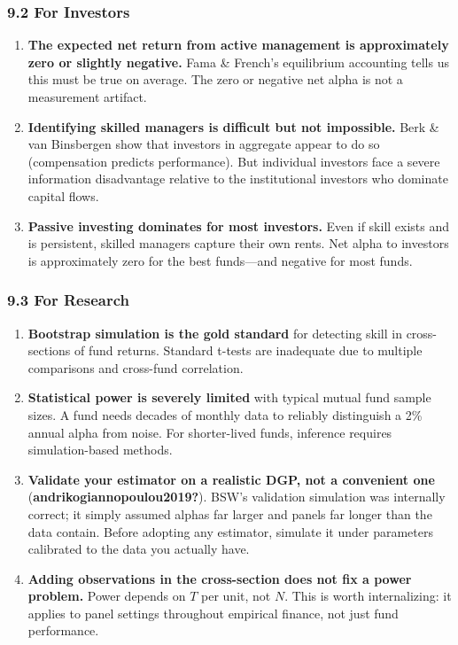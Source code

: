 \documentclass[
  letterpaper,
  DIV=11,
  numbers=noendperiod]{scrartcl}
\begin{document}
\subsubsection{9.2 For Investors}\label{for-investors}

\begin{enumerate}
\def\labelenumi{\arabic{enumi}.}
\setcounter{enumi}{3}
\item
  \textbf{The expected net return from active management is
  approximately zero or slightly negative.} Fama \& French's equilibrium
  accounting tells us this must be true on average. The zero or negative
  net alpha is not a measurement artifact.
\item
  \textbf{Identifying skilled managers is difficult but not impossible.}
  Berk \& van Binsbergen show that investors in aggregate appear to do
  so (compensation predicts performance). But individual investors face
  a severe information disadvantage relative to the institutional
  investors who dominate capital flows.
\item
  \textbf{Passive investing dominates for most investors.} Even if skill
  exists and is persistent, skilled managers capture their own rents.
  Net alpha to investors is approximately zero for the best funds---and
  negative for most funds.
\end{enumerate}

\subsubsection{9.3 For Research}\label{for-research}

\begin{enumerate}
\def\labelenumi{\arabic{enumi}.}
\setcounter{enumi}{6}
\item
  \textbf{Bootstrap simulation is the gold standard} for detecting skill
  in cross-sections of fund returns. Standard t-tests are inadequate due
  to multiple comparisons and cross-fund correlation.
\item
  \textbf{Statistical power is severely limited} with typical mutual
  fund sample sizes. A fund needs decades of monthly data to reliably
  distinguish a 2\% annual alpha from noise. For shorter-lived funds,
  inference requires simulation-based methods.
\item
  \textbf{Validate your estimator on a realistic DGP, not a convenient
  one} (\textbf{andrikogiannopoulou2019?}). BSW's validation simulation
  was internally correct; it simply assumed alphas far larger and panels
  far longer than the data contain. Before adopting any estimator,
  simulate it under parameters calibrated to the data you actually have.
\item
  \textbf{Adding observations in the cross-section does not fix a power
  problem.} Power depends on \(T\) per unit, not \(N\). This is worth
  internalizing: it applies to panel settings throughout empirical
  finance, not just fund performance.
\end{enumerate}
\end{document}
